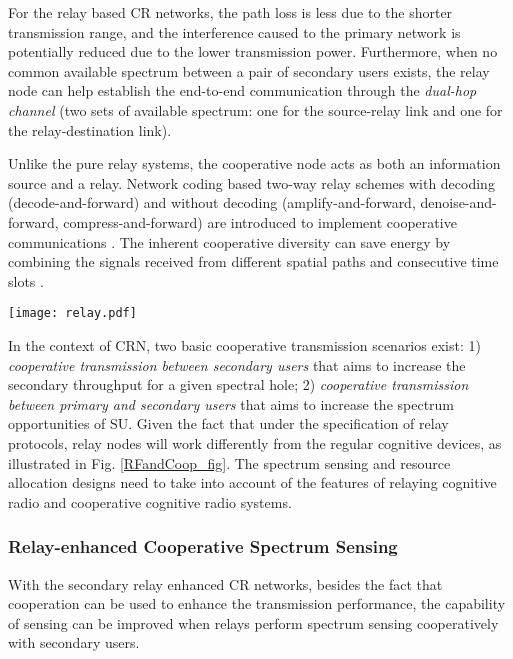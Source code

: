 \documentclass[journal,12pt,onecolumn]{IEEEtran}
\begin{document}
For the relay based CR networks, the path loss is less due to the shorter transmission range, and the interference caused to the primary network is potentially reduced due to the lower transmission power. Furthermore, when no common available spectrum between a pair of secondary users exists, the relay node can help establish the end-to-end communication through the \emph{dual-hop channel} \cite{5484603} (two sets of available spectrum: one for the source-relay link and one for the relay-destination link).

Unlike the pure relay systems, the cooperative node acts as both an information source and a relay. Network coding based two-way relay schemes with decoding (decode-and-forward) and without decoding (amplify-and-forward, denoise-and-forward, compress-and-forward) are introduced to implement cooperative communications \cite{relayDef}. The inherent cooperative diversity can save energy by combining the signals received from different spatial paths and consecutive time slots \cite{ccDEF}.

\begin{figure*}
\texttt{[image: relay.pdf]}
\caption{Relaying and cooperation in cognitive radio systems.}
\label{RFandCoop_fig}
\end{figure*}

In the context of CRN, two basic cooperative transmission scenarios exist: 1) {\emph{cooperative transmission between secondary users}} that aims to increase the secondary throughput for a given spectral hole; 2) {\emph{cooperative transmission between primary and secondary users}} that aims to increase the spectrum opportunities of SU. Given the fact that under the specification of relay protocols, relay nodes will work differently from the regular cognitive devices, as illustrated in Fig. \ref{RFandCoop_fig}. The spectrum sensing and resource allocation designs need to take into account of the features of relaying cognitive radio and cooperative cognitive radio systems.




\subsubsection{Relay-enhanced Cooperative Spectrum Sensing} With the secondary relay enhanced CR networks, besides the fact that cooperation can be used to enhance the transmission performance, the capability of sensing can be improved when relays perform spectrum sensing cooperatively with secondary users.
\end{document}
